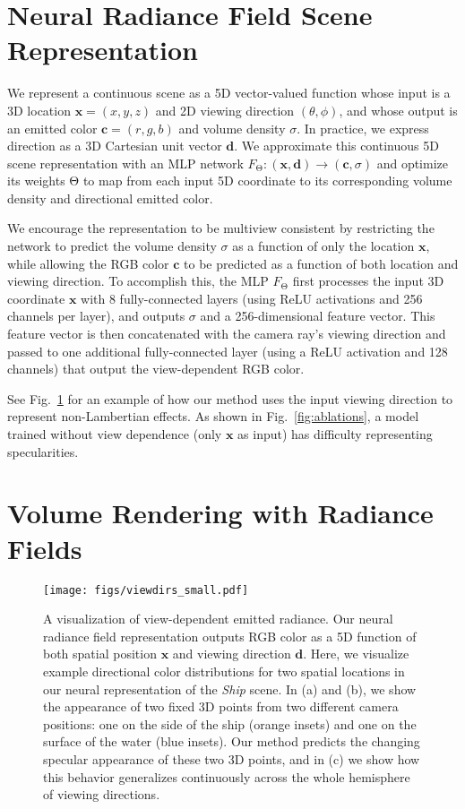 \documentclass[runningheads]{llncs}
\newcommand{\modeltheta}{\mathrm{\Theta}}
\newcommand{\scenename}[1]{\textit{#1}}
\begin{document}
\section{Neural Radiance Field Scene Representation}

We represent a continuous scene as a 5D vector-valued function whose input is a 3D location $\mathbf{x} = (x,y,z)$ and 2D viewing direction $(\theta, \phi)$, and whose output is an emitted color $\mathbf{c} = (r,g,b)$ and volume density $\sigma$. In practice, we express direction as a 3D Cartesian unit vector $\mathbf{d}$. We approximate this continuous 5D scene representation with an MLP network $F_{\modeltheta} : (\mathbf{x}, \mathbf{d}) \to (\mathbf{c},\sigma)$ and optimize its weights $\modeltheta$ to map from each input 5D coordinate to its corresponding volume density and directional emitted color. 

We encourage the representation to be multiview consistent by restricting the network to predict the volume density $\sigma$ as a function of only the location $\mathbf{x}$, while allowing the RGB color $\mathbf{c}$ to be predicted as a function of both location and viewing direction. To accomplish this, the MLP $F_\modeltheta$ first processes the input 3D coordinate $\mathbf{x}$ with 8 fully-connected layers (using ReLU activations and 256 channels per layer), and outputs $\sigma$ and a 256-dimensional feature vector. This feature vector is then concatenated with the camera ray's viewing direction and passed to one additional fully-connected layer (using a ReLU activation and 128 channels) that output the view-dependent RGB color.

See Fig.~\ref{fig:viewdirs} for an example of how our method uses the input viewing direction to represent non-Lambertian effects.
As shown in Fig.~\ref{fig:ablations}, a model trained without view dependence (only $\mathbf x$ as input) has difficulty representing specularities.




\section{Volume Rendering with Radiance Fields}
\label{sec:rendering}

\begin{figure}[t]
\centering
\texttt{[image: figs/viewdirs\_small.pdf]}
\caption{A visualization of view-dependent emitted radiance. Our neural radiance field representation outputs RGB color as a 5D function of both spatial position $\mathbf x$ and viewing direction $\mathbf d$. Here, we visualize example directional color distributions for two spatial locations in our neural representation of the \scenename{Ship} scene. 
In (a) and (b), we show the appearance of two fixed 3D points from two different camera positions: one on the side of the ship (orange insets) and one on the surface of the water (blue insets).
Our method predicts the changing specular appearance of these two 3D points, and in (c) we show how this behavior generalizes continuously across the whole hemisphere of viewing directions.
}
\label{fig:viewdirs}
\end{figure}
\end{document}
